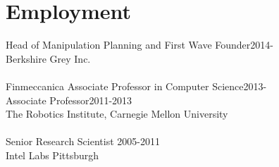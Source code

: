 
\section{Employment}
\noindent
\ifBG
Head of Manipulation Planning and First Wave Founder\hfill 2014-\\
Berkshire Grey Inc.\\
\\
\fi
Finmeccanica Associate Professor in Computer Science\hfill 2013-\\
Associate Professor\hfill 2011-2013\\
The Robotics Institute, 
Carnegie Mellon University\\
\\
Senior Research Scientist \hfill 2005-2011\\
Intel Labs Pittsburgh\\
